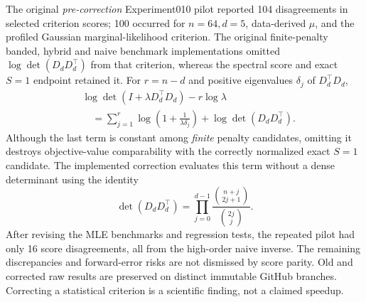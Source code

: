 The original \emph{pre-correction} Experiment010 pilot reported
104 disagreements in selected criterion scores; 100 occurred
for $n=64,d=5$, data-derived $\mu$, and the profiled
Gaussian marginal-likelihood criterion. The original finite-penalty
banded, hybrid and naive benchmark implementations omitted
$\log\det(D_dD_d^\top)$ from that criterion, whereas the spectral
score and exact $S=1$ endpoint retained it. For $r=n-d$ and
positive eigenvalues $\delta_j$ of $D_d^\top D_d$,
\begin{equation}\label{eq:experiment010_mle}
\begin{aligned}
&\log\det(I+\lambda D_d^\top D_d)-r\log\lambda\\
&\quad=\sum_{j=1}^r\log\left(1+\frac1{\lambda\delta_j}\right)
+\log\det(D_dD_d^\top).
\end{aligned}
\end{equation}
Although the last term is constant among \emph{finite}
penalty candidates, omitting it destroys objective-value
comparability with the correctly normalized exact
$S=1$ candidate. The implemented correction evaluates
this term without a dense determinant using the identity
\begin{equation}\label{eq:experiment010_gram}
\det(D_dD_d^\top)=
\prod_{j=0}^{d-1}
\frac{\binom{n+j}{2j+1}}{\binom{2j}{j}}.
\end{equation}
After revising the MLE benchmarks and regression tests,
the repeated pilot had only 16 score disagreements, all
from the high-order naive inverse. The remaining discrepancies
and forward-error risks are not dismissed by score parity.
Old and corrected raw results are preserved on distinct
immutable GitHub branches. Correcting a statistical
criterion is a scientific finding, not a claimed speedup.

